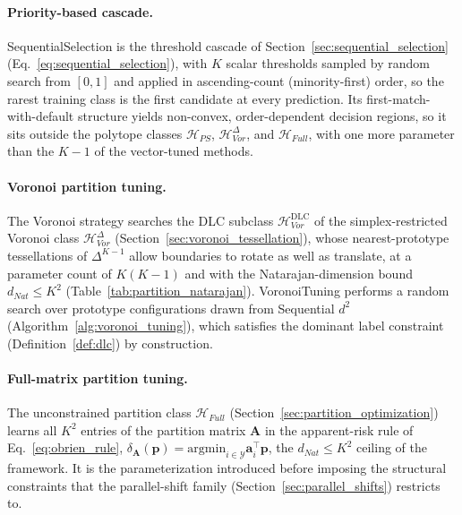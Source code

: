 \begin{itemize}
\end{itemize}

\paragraph{Priority-based cascade.} SequentialSelection is the threshold cascade of Section~\ref{sec:sequential_selection} (Eq.~\ref{eq:sequential_selection}), with $K$ scalar thresholds sampled by random search from $[0, 1]$ and applied in ascending-count (minority-first) order, so the rarest training class is the first candidate at every prediction. Its first-match-with-default structure yields non-convex, order-dependent decision regions, so it sits outside the polytope classes $\mathcal{H}_{PS}$, $\mathcal{H}_{Vor}^{\Delta}$, and $\mathcal{H}_{Full}$, with one more parameter than the $K-1$ of the vector-tuned methods.

\paragraph{Voronoi partition tuning.} The Voronoi strategy searches the DLC subclass $\mathcal{H}_{Vor}^{\mathrm{DLC}}$ of the simplex-restricted Voronoi class $\mathcal{H}_{Vor}^{\Delta}$ (Section~\ref{sec:voronoi_tessellation}), whose nearest-prototype tessellations of $\Delta^{K-1}$ allow boundaries to rotate as well as translate, at a parameter count of $K(K-1)$ and with the Natarajan-dimension bound $d_{Nat} \le K^2$ (Table~\ref{tab:partition_natarajan}). VoronoiTuning performs a random search over prototype configurations drawn from Sequential $d^2$ (Algorithm~\ref{alg:voronoi_tuning}), which satisfies the dominant label constraint (Definition~\ref{def:dlc}) by construction.

\paragraph{Full-matrix partition tuning.} The unconstrained partition class $\mathcal{H}_{Full}$ (Section~\ref{sec:partition_optimization}) learns all $K^2$ entries of the partition matrix $\mathbf{A}$ in the apparent-risk rule of Eq.~\ref{eq:obrien_rule}, $\delta_{\mathbf{A}}(\mathbf{p}) = \mathrm{argmin}_{i \in \mathcal{Y}} \mathbf{a}_i^\top \mathbf{p}$, the $d_{Nat} \le K^2$ ceiling of the framework. It is the parameterization \citet{obrien2008costsensitive} introduced before imposing the structural constraints that the parallel-shift family (Section~\ref{sec:parallel_shifts}) restricts to.

